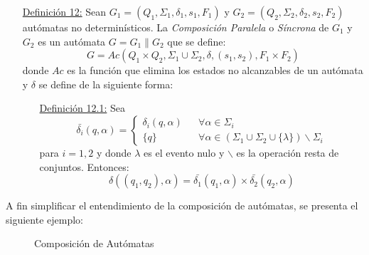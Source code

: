 \begin{itemize}
  \item [\underline{Definición 12:}] Sean $G_{1} = (Q_{1}, \Sigma_{1},
  \delta_{1}, s_{1}, F_{1})$ y $G_{2} = (Q_{2}, \Sigma_{2}, \delta_{2}, s_{2},
  F_{2})$ autómatas no determinísticos. La \textit{Composición Paralela} o
  \textit{Síncrona} de $G_{1}$ y $G_{2}$ es un autómata $G = G_{1} \parallel
  G_{2}$ que se define:
  $$ G = Ac(Q_{1} \times Q_{2}, \Sigma_{1} \cup \Sigma_{2}, \delta, (s_{1},
  s_{2}), F_{1} \times F_{2}) $$ donde $Ac$ es la función que elimina los estados no
 alcanzables de un autómata y $ \delta $ se define de la siguiente forma:
 \begin{itemize}
   \item [\underline{Definición 12.1:}] Sea
   $$ \bar{\delta_{i}}(q,\alpha) =
   \left\{ 
     \begin{array}{lll}
      \delta_{i}(q, \alpha) & & \forall \alpha \in \Sigma_{i} \\
      \{q\} & & \forall \alpha \in (\Sigma_{1} \cup \Sigma_{2} \cup \{\lambda\})
      \backslash \Sigma_{i}
     \end{array}
   \right. $$
   para $i = 1,2$ y donde $\lambda$ es el evento nulo y $\backslash$ es la
   operación resta de conjuntos.
   Entonces: $$ \delta((q_{1},
   q_{2}), \alpha) = \bar{\delta_{1}}(q_{1}, \alpha) \times \bar{\delta_{2}}(q_{2}, \alpha) $$
 \end{itemize}
\end{itemize}

A fin simplificar el entendimiento de la composición de autómatas, se presenta
el siguiente ejemplo:

\begin{figure}[h]
  \centering
  \caption{Composición de Autómatas}
  \label{fig:composicion_automatas}
\end{figure}

